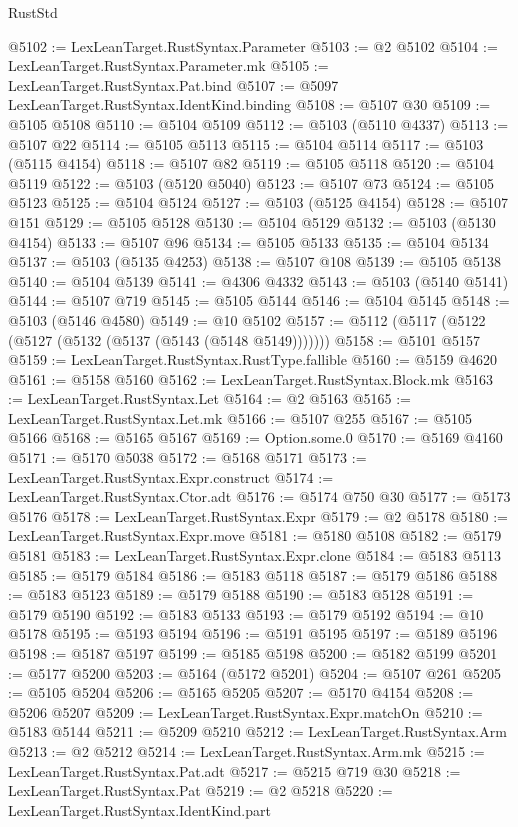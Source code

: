 \begin{lexlean}{RustStd}
\begin{coremodule}
@5102 := LexLeanTarget.RustSyntax.Parameter
@5103 := @2 @5102
@5104 := LexLeanTarget.RustSyntax.Parameter.mk
@5105 := LexLeanTarget.RustSyntax.Pat.bind
@5107 := @5097 LexLeanTarget.RustSyntax.IdentKind.binding
@5108 := @5107 @30
@5109 := @5105 @5108
@5110 := @5104 @5109
@5112 := @5103 (@5110 @4337)
@5113 := @5107 @22
@5114 := @5105 @5113
@5115 := @5104 @5114
@5117 := @5103 (@5115 @4154)
@5118 := @5107 @82
@5119 := @5105 @5118
@5120 := @5104 @5119
@5122 := @5103 (@5120 @5040)
@5123 := @5107 @73
@5124 := @5105 @5123
@5125 := @5104 @5124
@5127 := @5103 (@5125 @4154)
@5128 := @5107 @151
@5129 := @5105 @5128
@5130 := @5104 @5129
@5132 := @5103 (@5130 @4154)
@5133 := @5107 @96
@5134 := @5105 @5133
@5135 := @5104 @5134
@5137 := @5103 (@5135 @4253)
@5138 := @5107 @108
@5139 := @5105 @5138
@5140 := @5104 @5139
@5141 := @4306 @4332
@5143 := @5103 (@5140 @5141)
@5144 := @5107 @719
@5145 := @5105 @5144
@5146 := @5104 @5145
@5148 := @5103 (@5146 @4580)
@5149 := @10 @5102
@5157 := @5112 (@5117 (@5122 (@5127 (@5132 (@5137 (@5143 (@5148 @5149)))))))
@5158 := @5101 @5157
@5159 := LexLeanTarget.RustSyntax.RustType.fallible
@5160 := @5159 @4620
@5161 := @5158 @5160
@5162 := LexLeanTarget.RustSyntax.Block.mk
@5163 := LexLeanTarget.RustSyntax.Let
@5164 := @2 @5163
@5165 := LexLeanTarget.RustSyntax.Let.mk
@5166 := @5107 @255
@5167 := @5105 @5166
@5168 := @5165 @5167
@5169 := Option.some.{0}
@5170 := @5169 @4160
@5171 := @5170 @5038
@5172 := @5168 @5171
@5173 := LexLeanTarget.RustSyntax.Expr.construct
@5174 := LexLeanTarget.RustSyntax.Ctor.adt
@5176 := @5174 @750 @30
@5177 := @5173 @5176
@5178 := LexLeanTarget.RustSyntax.Expr
@5179 := @2 @5178
@5180 := LexLeanTarget.RustSyntax.Expr.move
@5181 := @5180 @5108
@5182 := @5179 @5181
@5183 := LexLeanTarget.RustSyntax.Expr.clone
@5184 := @5183 @5113
@5185 := @5179 @5184
@5186 := @5183 @5118
@5187 := @5179 @5186
@5188 := @5183 @5123
@5189 := @5179 @5188
@5190 := @5183 @5128
@5191 := @5179 @5190
@5192 := @5183 @5133
@5193 := @5179 @5192
@5194 := @10 @5178
@5195 := @5193 @5194
@5196 := @5191 @5195
@5197 := @5189 @5196
@5198 := @5187 @5197
@5199 := @5185 @5198
@5200 := @5182 @5199
@5201 := @5177 @5200
@5203 := @5164 (@5172 @5201)
@5204 := @5107 @261
@5205 := @5105 @5204
@5206 := @5165 @5205
@5207 := @5170 @4154
@5208 := @5206 @5207
@5209 := LexLeanTarget.RustSyntax.Expr.matchOn
@5210 := @5183 @5144
@5211 := @5209 @5210
@5212 := LexLeanTarget.RustSyntax.Arm
@5213 := @2 @5212
@5214 := LexLeanTarget.RustSyntax.Arm.mk
@5215 := LexLeanTarget.RustSyntax.Pat.adt
@5217 := @5215 @719 @30
@5218 := LexLeanTarget.RustSyntax.Pat
@5219 := @2 @5218
@5220 := LexLeanTarget.RustSyntax.IdentKind.part

\end{coremodule}
\end{lexlean}
